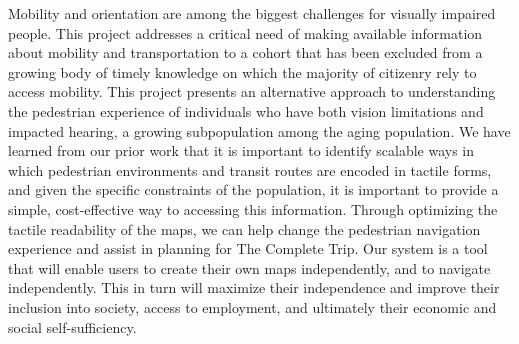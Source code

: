 
Mobility and orientation are among the biggest challenges for visually impaired people.
This project addresses a critical need of making available information about mobility and transportation to a cohort that has been excluded from a growing body of timely knowledge on which the majority of citizenry rely to access mobility.
This project presents an alternative approach to understanding the pedestrian experience of individuals who have both vision limitations and impacted hearing, a growing subpopulation among the aging population. 
We have learned from our prior work that it is important to identify scalable ways in which pedestrian environments and transit routes are encoded in tactile forms, and given the specific constraints of the population, it is important to provide a simple, cost-effective way to accessing this information.
Through optimizing the tactile readability of the maps, we can help change the pedestrian navigation experience and assist in planning for The Complete Trip. Our system is a tool that will enable users to create their own maps independently, and to navigate independently. This in turn will maximize their independence and improve their inclusion into society, access to employment, and ultimately their economic and social self-sufficiency. 
